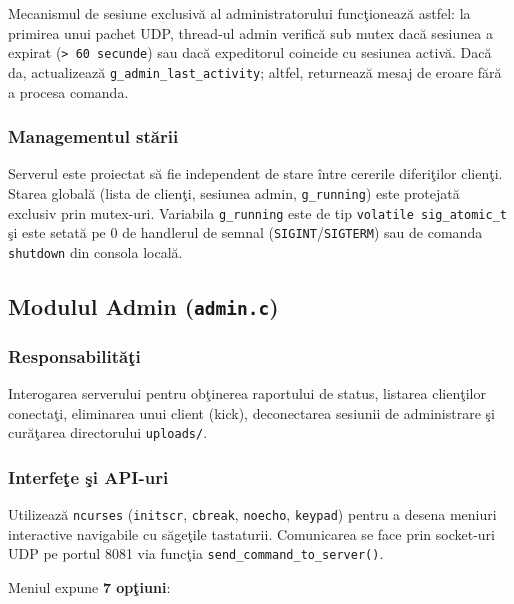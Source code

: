 \documentclass[12pt, a4paper]{article}
\begin{document}
Mecanismul de sesiune exclusiv\u{a} al administratorului func\c{t}ioneaz\u{a} astfel: la primirea
unui pachet UDP, thread-ul admin verific\u{a} sub mutex dac\u{a} sesiunea a expirat
(\texttt{>~60~secunde}) sau dac\u{a} expeditorul coincide cu sesiunea activ\u{a}. Dac\u{a} da,
actualizeaz\u{a} \texttt{g\_admin\_last\_activity}; altfel, returneaz\u{a} mesaj de eroare
f\u{a}r\u{a} a procesa comanda.

\subsubsection{Managementul st\u{a}rii}

Serverul este proiectat s\u{a} fie independent de stare \^{i}ntre cererile diferi\c{t}ilor clien\c{t}i.
Starea global\u{a} (lista de clien\c{t}i, sesiunea admin, \texttt{g\_running}) este protejat\u{a}
exclusiv prin mutex-uri. Variabila \texttt{g\_running} este de tip \texttt{volatile sig\_atomic\_t}
\c{s}i este setat\u{a} pe 0 de handlerul de semnal (\texttt{SIGINT}/\texttt{SIGTERM}) sau de comanda
\texttt{shutdown} din consola local\u{a}.

\subsection{Modulul Admin (\texttt{admin.c})}

\subsubsection{Responsabilit\u{a}\c{t}i}

Interogarea serverului pentru ob\c{t}inerea raportului de status, listarea clien\c{t}ilor
conecta\c{t}i, eliminarea unui client (kick), deconectarea sesiunii de administrare \c{s}i
cur\u{a}\c{t}area directorului \texttt{uploads/}.

\subsubsection{Interfe\c{t}e \c{s}i API-uri}

Utilizeaz\u{a} \texttt{ncurses} (\texttt{initscr}, \texttt{cbreak}, \texttt{noecho},
\texttt{keypad}) pentru a desena meniuri interactive navigabile cu s\u{a}ge\c{t}ile tastaturii.
Comunicarea se face prin socket-uri UDP pe portul 8081 via func\c{t}ia \texttt{send\_command\_to\_server()}.

Meniul expune \textbf{7 op\c{t}iuni}:
\end{document}
